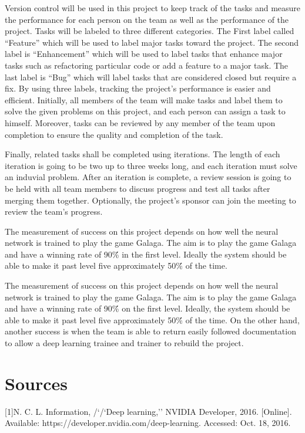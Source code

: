 \documentclass[letterpaper,10pt]{article}
\begin{document}
Version control will be used in this project to keep track of the tasks and measure the performance for each person on the team as well as the performance of the project.
 Tasks will be labeled to three different categories.
 The First label called “Feature” which will be used to label major tasks toward the project.
 The second label is “Enhancement” which will be used to label tasks that enhance major tasks such as refactoring particular code or add a feature to a major task.
 The last label is “Bug” which will label tasks that are considered closed but require a fix.
 By using three labels, tracking the project’s performance is easier and efficient.
 Initially, all members of the team will make tasks and label them to solve the given problems on this project, and each person can assign a task to himself.
 Moreover, tasks can be reviewed by any member of the team upon completion to ensure the quality and completion of the task.


Finally, related tasks shall be completed using iterations.
 The length of each iteration is going to be two up to three weeks long, and each iteration must solve an induvial problem.
 After an iteration is complete, a review session is going to be held with all team members to discuss progress and test all tasks after merging them together.
 Optionally, the project’s sponsor can join the meeting to review the team's progress.

The measurement of success on this project depends on how well the neural network is trained to play the game Galaga.
The aim is to play the game Galaga and have a winning rate of 90\'\% in the first level.
Ideally the system should be able to make it past level five approximately 50\'\% of the time.

The measurement of success on this project depends on how well the neural network is trained to play the game Galaga. 
The aim is to play the game Galaga and have a winning rate of 90\'\% on the first level.
Ideally, the system should be able to make it past level five approximately 50\'\% of the time.
On the other hand, another success is when the team is able to return easily followed documentation to allow a deep learning trainee and trainer to rebuild the project.
\section{Sources}

[1]N. C. L. Information, /`/`Deep learning,'' NVIDIA Developer, 2016. [Online]. Available: https://developer.nvidia.com/deep-learning. Accessed: Oct. 18, 2016.
\end{document}
